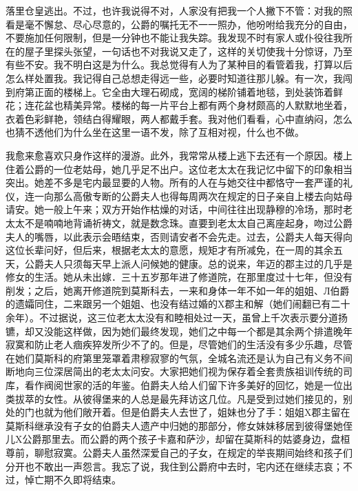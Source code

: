 \documentclass[12pt, UTF8]{ctexbook}
\begin{document}
落里仓皇逃出。不过，也许我说得不对，人家没有把我一个人撇下不管：对我的照看是毫不懈怠、尽心尽意的，公爵的嘱托无不一一照办，他吩咐给我充分的自由，不要施加任何限制，但是一分钟也不能让我失踪。我发现不时有家人或仆役往我所在的屋子里探头张望，一句话也不对我说又走了，这样的关切使我十分惊讶，乃至有些不安。我不明白这是为什么。我总觉得有人为了某种目的看管着我，打算以后怎么样处置我。我记得自己总想走得远一些，必要时知道往那儿躲。有一次，我闯到府第正面的楼梯上。它全由大理石砌成，宽阔的梯阶铺着地毯，到处装饰着鲜花；连花盆也精美异常。楼梯的每一片平台上都有两个身材颇高的人默默地坐着，衣着色彩鲜艳，领结白得耀眼，两人都戴手套。我对他们看看，心中直纳闷，怎么也猜不透他们为什么坐在这里一语不发，除了互相对视，什么也不做。
\par 我愈来愈喜欢只身作这样的漫游。此外，我常常从楼上逃下去还有一个原因。楼上住着公爵的一位老姑母，她几乎足不出户。这位老太太在我记忆中留下的印象相当突出。她差不多是宅内最显要的人物。所有的人在与她交往中都恪守一套严谨的礼仪，连一向那么高傲专断的公爵夫人也得每周两次在规定的日子亲自上楼去向姑母请安。她一般上午来；双方开始作枯燥的对话，中间往往出现静穆的冷场，那时老太太不是喃喃地背诵祈祷文，就是数念珠。直要到老太太自己离座起身，吻过公爵夫人的嘴唇，以此表示会晤结束，否则请安者不会先走。过去，公爵夫人每天得向这位长辈问好，但后来，根据老太太的意愿，规矩才有所减免，在一周的其余五天，公爵夫人只须每天早上派人问候她的健康。总的说来，年迈的郡主过的几乎是修女的生活。她从未出嫁．三十五岁那年进了修道院，在那里度过十七年，但没有削发；之后，她离开修道院到莫斯科去，一来和身体一年不如一年的姐姐、Л伯爵的遗孀同住，二来跟另一个姐姐、也没有结过婚的X郡主和解（她们闹翻已有二十余年）。不过据说，这三位老太太没有和睦相处过一天，虽曾上千次表示要分道扬镳，却又没能这样做，因为她们最终发现，她们之中每一个都是其余两个排遣晚年寂寞和防止老人痼疾猝发所少不了的。但是，尽管她们的生活没有多少乐趣，尽管在她们莫斯科的府第里笼罩着肃穆寂寥的气氛，全城名流还是认为自己有义务不间断地向三位深居简出的老太太问安。大家把她们视为保存着全套贵族祖训传统的司库，看作阀阅世家的活的年鉴。伯爵夫人给人们留下许多美好的回忆，她是一位出类拔萃的女性。从彼得堡来的人总是最先拜访这几位。凡是受到过她们接见的，别处的门也就为他们敞开着。但是伯爵夫人去世了，姐妹也分了手：姐姐X郡主留在莫斯科继承没有子女的伯爵夫人遗产中归她的那部分，修女妹妹移居到彼得堡她侄儿X公爵那里去。而公爵的两个孩子卡嘉和萨沙，却留在莫斯科的姑婆身边，盘桓尊前，聊慰寂寞。公爵夫人虽然深爱自己的子女，在规定的举丧期间始终和孩子们分开也不敢出一声怨言。我忘了说，我住到公爵府中去时，宅内还在继续志哀；不过，悼亡期不久即将结束。
\end{document}
